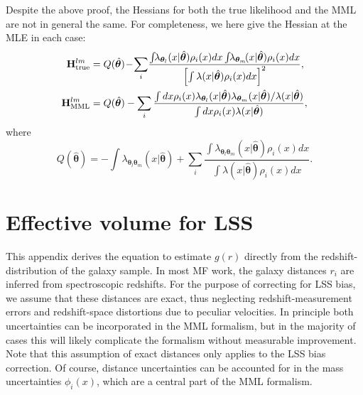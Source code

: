 \documentclass[a4paper,fleqn,usenatbib]{mnras}
\newcommand{\para}{{\bm{\theta}}}
\begin{document}
Despite the above proof, the Hessians for both the true likelihood and the MML are not in general the same. For completeness, we here give the Hessian at the MLE in each case:
\begin{align}
	\mathbf{H}^{lm}_{\rm true} &= Q(\hat{\para})\!-\!\sum_i\!\frac{\int\!\!\lambda_{\para_l}(x|\hat{\para}) \rho_i(x) dx \int\!\!\lambda_{\para_m}\!(x|\hat{\para}) \rho_i(x) dx}{\left[\int \lambda(x|\hat{\para}) \rho_i(x) dx\right]^2},\label{eq:htrue} \\
   \mathbf{H}^{lm}_{\rm MML} &=  Q(\hat{\para}) -\sum_i \frac{\int dx \rho_i(x)\lambda_{\para_l}(x|\hat{\para})\lambda_{\para_m} (x|\hat{\para}) /\lambda(x|\hat{\para})}{\int dx \rho_i(x) \lambda(x|\hat{\para})},\label{eq:hmml}
\end{align}
where
\begin{equation}
Q(\hat{\para}) = -\int \lambda_{\para_l \para_m}(x|\hat{\para}) + \sum_i \frac{\int \lambda_{\para_l \para_m}(x|\hat{\para}) \rho_i(x) dx}{\int \lambda(x|\hat{\para}) \rho_i(x) dx}.
\end{equation}

\section{Effective volume for LSS}\label{a:lss}

This appendix derives the equation to estimate $g(r)$ directly from the redshift-distribution of the galaxy sample. In most MF work, the galaxy distances $r_i$ are inferred from spectroscopic redshifts. For the purpose of correcting for LSS bias, we assume that these distances are exact, thus neglecting redshift-measurement errors and redshift-space distortions due to peculiar velocities. In principle both uncertainties can be incorporated in the MML formalism, but in the majority of cases this will likely complicate the formalism without measurable improvement. Note that this assumption of exact distances only applies to the LSS bias correction. Of course, distance uncertainties can be accounted for in the mass uncertainties $\phi_i(x)$, which are a central part of the MML formalism.
\end{document}
